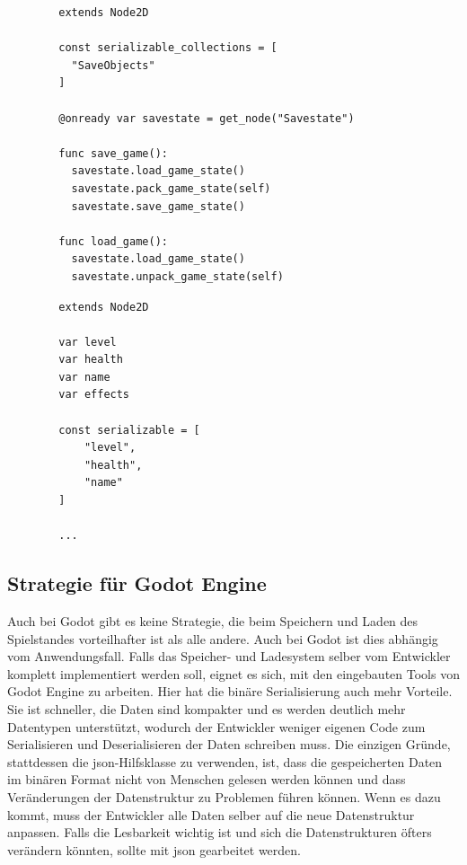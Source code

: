 \begin{listing}[htp]
    \begin{verbatim}
        extends Node2D

        const serializable_collections = [
          "SaveObjects"
        ]

        @onready var savestate = get_node("Savestate")

        func save_game():
          savestate.load_game_state()
          savestate.pack_game_state(self)  
          savestate.save_game_state()

        func load_game():
          savestate.load_game_state()
          savestate.unpack_game_state(self)
    \end{verbatim}
    \caption{Speichern und Laden des "SaveObjects"-Knoten mit Thoth \cite{stupidratstudioGodotSaveLoad}}
    \label{lst:godotThoth}
\end{listing} 

\begin{listing}[htp]
    \begin{verbatim}
        extends Node2D

        var level
        var health
        var name
        var effects

        const serializable = [
            "level",
            "health",
            "name"
        ]

        ...
    \end{verbatim}
    \caption{Thoth-Einstellung, welche Variablen einer Klasse serialisiert werden sollen \cite{stupidratstudioGodotSaveLoad}}
    \label{lst:godotThothObject}
\end{listing} 



\subsection{Strategie für Godot Engine}
Auch bei Godot gibt es keine Strategie, die beim Speichern und Laden des Spielstandes vorteilhafter ist als alle andere. Auch bei Godot ist dies abhängig vom Anwendungsfall. Falls das Speicher- und Ladesystem selber vom Entwickler komplett implementiert werden soll, eignet es sich, mit den eingebauten Tools von Godot Engine zu arbeiten. Hier hat die binäre Serialisierung auch mehr Vorteile. Sie ist schneller, die Daten sind kompakter und es werden deutlich mehr Datentypen unterstützt, wodurch der Entwickler weniger eigenen Code zum Serialisieren und Deserialisieren der Daten schreiben muss. Die einzigen Gründe, stattdessen die \ac{json}-Hilfsklasse zu verwenden, ist, dass die gespeicherten Daten im binären Format nicht von Menschen gelesen werden können und dass Veränderungen der Datenstruktur zu Problemen führen können. Wenn es dazu kommt, muss der Entwickler alle Daten selber auf die neue Datenstruktur anpassen. Falls die Lesbarkeit wichtig ist und sich die Datenstrukturen öfters verändern könnten, sollte mit \ac{json} gearbeitet werden.

